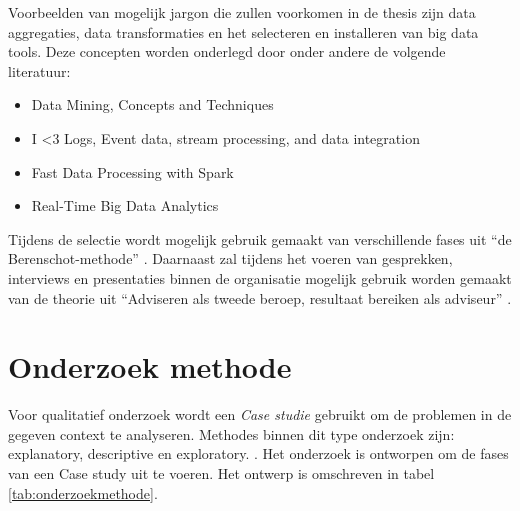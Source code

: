 Voorbeelden van mogelijk jargon die zullen voorkomen in de thesis zijn data aggregaties, data transformaties en het selecteren en installeren van big data tools. Deze concepten worden onderlegd door onder andere de volgende literatuur:

\begin{itemize}
    \item Data Mining, Concepts and Techniques \parencite{data-mining}
    \item I <3 Logs, Event data, stream processing, and data integration \parencite{logs}
    \item Fast Data Processing with Spark \parencite{spark}
    \item Real-Time Big Data Analytics \parencite{realtime-architectures}
\end{itemize}

Tijdens de selectie wordt mogelijk gebruik gemaakt van verschillende fases uit “de Berenschot-methode” \parencite{cuppen}.
Daarnaast zal tijdens het voeren van gesprekken, interviews en presentaties binnen de organisatie mogelijk gebruik worden gemaakt van de theorie uit “Adviseren als tweede beroep, resultaat bereiken als adviseur” \parencite{adviseren}.

\newpage

\section{Onderzoek methode} %


Voor qualitatief onderzoek wordt een \textit{Case studie} gebruikt om de problemen in de gegeven context te analyseren. Methodes binnen dit type onderzoek zijn: explanatory, descriptive en exploratory. \parencite{john-dudovskiy}. Het onderzoek is ontworpen om de fases van een Case study uit te voeren. Het ontwerp is omschreven in tabel \ref{tab:onderzoekmethode}.


